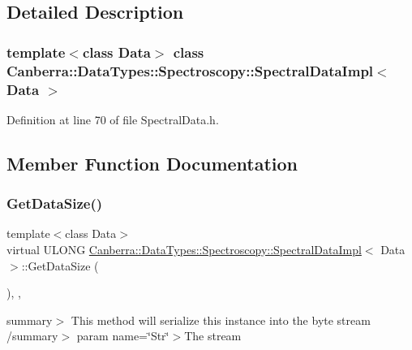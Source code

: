\subsection{Detailed Description}
\subsubsection*{template$<$class Data$>$\newline
class Canberra\+::\+Data\+Types\+::\+Spectroscopy\+::\+Spectral\+Data\+Impl$<$ Data $>$}



Definition at line 70 of file Spectral\+Data.\+h.



\subsection{Member Function Documentation}
\mbox{\label{class_canberra_1_1_data_types_1_1_spectroscopy_1_1_spectral_data_impl_aa681684f88b9e64aa2b8208f4525863d_aa681684f88b9e64aa2b8208f4525863d}} 
\subsubsection{\texorpdfstring{Get\+Data\+Size()}{GetDataSize()}}
{\footnotesize\ttfamily template$<$class Data$>$ \\
virtual U\+L\+O\+NG \hyperlink{class_canberra_1_1_data_types_1_1_spectroscopy_1_1_spectral_data_impl}{Canberra\+::\+Data\+Types\+::\+Spectroscopy\+::\+Spectral\+Data\+Impl}$<$ Data $>$\+::Get\+Data\+Size (\begin{DoxyParamCaption}{ }\end{DoxyParamCaption})\hspace{0.3cm}{\ttfamily [inline]}, {\ttfamily [protected]}, {\ttfamily [virtual]}}

summary$>$ This method will serialize this instance into the byte stream /summary$>$ param name=\char`\"{}\+Str\char`\"{}$>$The stream

